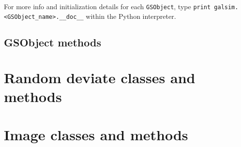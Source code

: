 \documentclass[preprint,10pt]{aastex}
\newcommand{\gsobject}{{\tt GSObject}}
\begin{document}
For more info and initialization details for each \gsobject, type {\tt print
  galsim.<GSObject\_name>.\_\_doc\_\_} within the Python interpreter.

\subsection{GSObject methods}


\section{Random deviate classes and methods}\label{sect:random}


\section{Image classes and methods}\label{sect:image}
\end{document}
